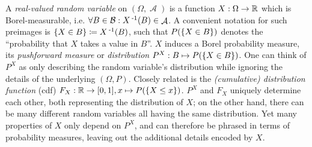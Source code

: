 \documentclass[a4paper]{scrreprt}
\DeclareMathOperator{\A}{\mathcal{A}}
\newcommand{\Rp}{\mathbb{R}_{\geq 0}}
\newcommand{\B}{\mathcal{B}}
\theoremstyle{definition}
\begin{document}
    A \emph{real-valued random variable} on $(\Omega, \A)$ is a function $X: \Omega \to \mathbb{R}$ which is Borel-measurable, i.e. $\forall B \in \B: X\inv(B) \in \A$. 
    A convenient notation for such preimages is $\{X \in B\} \coloneqq X\operatorname{^{-1}}(B)$, such that $P(\{X \in B\})$ denotes the “probability that $X$ takes a value in $B$”.
    $X$ induces a Borel probability measure, its \emph{pushforward measure} or \emph{distribution} $P^X: B \mapsto P(\{X \in B\})$. One can think of $P^X$ as only describing the random variable's distribution while ignoring the details of the underlying $(\Omega, P)$.
    Closely related is the \emph{(cumulative) distribution function} (cdf) $F_X: \mathbb{R} \to [0, 1], x \mapsto P(\{X \leq x\})$.
    $P^X$ and $F_X$ uniquely determine each other, both representing the distribution of $X$; on the other hand, there can be many different random variables all having the same distribution.
    Yet many properties of $X$ only depend on $P^X$, and can therefore be phrased in terms of probability measures, leaving out the additional details encoded by $X$.
    
    
\end{document}
